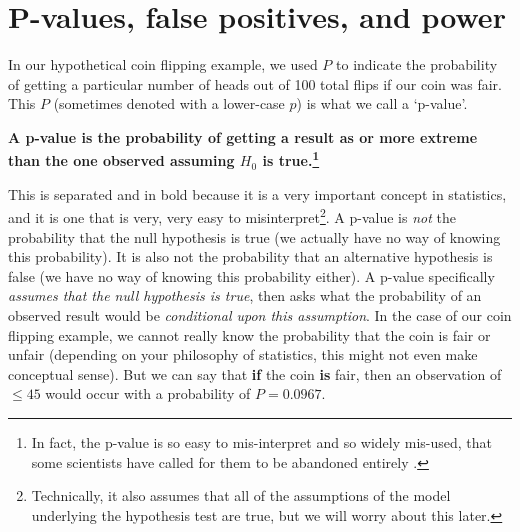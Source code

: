 \documentclass[
  openany]{krantz}
\renewenvironment{quote}{\begin{VF}}{\end{VF}}
\begin{document}
\hypertarget{p-values-false-positives-and-power}{%
\section{P-values, false positives, and power}\label{p-values-false-positives-and-power}}

In our hypothetical coin flipping example, we used \(P\) to indicate the probability of getting a particular number of heads out of 100 total flips if our coin was fair.
This \(P\) (sometimes denoted with a lower-case \(p\)) is what we call a `p-value'.

\begin{quote}
\textbf{A p-value is the probability of getting a result as or more extreme than the one observed assuming \(H_{0}\) is true.\footnote{In fact, the p-value is so easy to mis-interpret and so widely mis-used, that some scientists have called for them to be abandoned entirely \citetext{\citealp{Wasserstein2016}; \citealp[but see][]{Stanton-Geddes2014}; \citealp{Mayo2019}}.}}
\end{quote}

This is separated and in bold because it is a very important concept in statistics, and it is one that is very, very easy to misinterpret\footnote{Technically, it also assumes that all of the assumptions of the model underlying the hypothesis test are true, but we will worry about this later.}.
A p-value is \emph{not} the probability that the null hypothesis is true (we actually have no way of knowing this probability).
It is also not the probability that an alternative hypothesis is false (we have no way of knowing this probability either).
A p-value specifically \emph{assumes that the null hypothesis is true}, then asks what the probability of an observed result would be \emph{conditional upon this assumption}.
In the case of our coin flipping example, we cannot really know the probability that the coin is fair or unfair (depending on your philosophy of statistics, this might not even make conceptual sense).
But we can say that \textbf{if} the coin \textbf{is} fair, then an observation of \(\leq 45\) would occur with a probability of \(P = 0.0967\).
\end{document}
